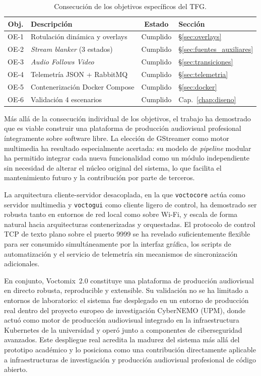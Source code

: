 \begin{table}[H]
  \centering
  \caption{Consecución de los objetivos específicos del TFG.}
  \label{tab:objetivos_cumplidos}
  \begin{tabular}{|c|l|c|l|}
    \hline
    \textbf{Obj.} & \textbf{Descripción} & \textbf{Estado} & \textbf{Sección} \\
    \hline
    OE-1 & Rotulación dinámica y overlays   & Cumplido & \S\ref{sec:overlays} \\
    OE-2 & \textit{Stream blanker} (3 estados) & Cumplido & \S\ref{sec:fuentes_auxiliares} \\
    OE-3 & \textit{Audio Follows Video}     & Cumplido & \S\ref{sec:transiciones} \\
    OE-4 & Telemetría JSON + RabbitMQ       & Cumplido & \S\ref{sec:telemetria} \\
    OE-5 & Contenerización Docker Compose   & Cumplido & \S\ref{sec:docker} \\
    OE-6 & Validación 4 escenarios          & Cumplido & Cap.~\ref{chap:diseno} \\
    \hline
  \end{tabular}
\end{table}

\vspace{0.3cm}

Más allá de la consecución individual de los objetivos, el trabajo ha demostrado que
es viable construir una plataforma de producción audiovisual profesional íntegramente
sobre software libre. La elección de GStreamer como motor multimedia ha resultado
especialmente acertada: su modelo de \textit{pipeline} modular ha permitido integrar
cada nueva funcionalidad como un módulo independiente sin necesidad de alterar el
núcleo original del sistema, lo que facilita el mantenimiento futuro y la contribución
por parte de terceros.

La arquitectura cliente-servidor desacoplada, en la que \texttt{voctocore} actúa como
servidor multimedia y \texttt{voctogui} como cliente ligero de control, ha demostrado
ser robusta tanto en entornos de red local como sobre Wi-Fi, y escala de forma natural
hacia arquitecturas contenerizadas y orquestadas. El protocolo de control TCP de texto
plano sobre el puerto 9999 se ha revelado suficientemente flexible para ser consumido
simultáneamente por la interfaz gráfica, los scripts de automatización y el servicio
de telemetría sin mecanismos de sincronización adicionales.

En conjunto, Voctomix~2.0 constituye una plataforma de producción audiovisual en
directo robusta, reproducible y extensible. Su validación no se ha limitado a entornos
de laboratorio: el sistema fue desplegado en un entorno de producción real dentro del
proyecto europeo de investigación CyberNEMO (UPM), donde actuó como motor de
producción audiovisual integrado en la infraestructura Kubernetes de la universidad y
operó junto a componentes de ciberseguridad avanzados. Este despliegue real acredita
la madurez del sistema más allá del prototipo académico y lo posiciona como una
contribución directamente aplicable a infraestructuras de investigación y producción
audiovisual profesional de código abierto.
